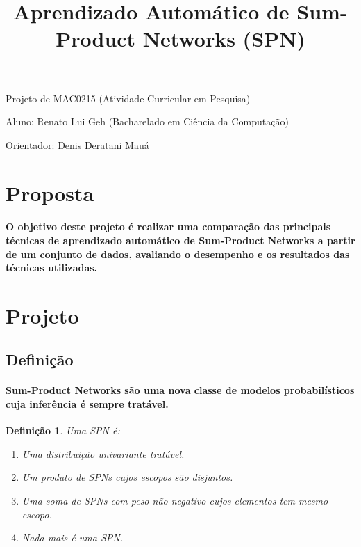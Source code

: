 \documentclass[a4paper,10pt]{article}
\title{\textbf{Aprendizado Automático de Sum-Product Networks (SPN)}}
\theoremstyle{plain}
\newtheorem*{spn-def}{Definição}
\begin{document}
\date{}
\author{}
\vspace*{-40pt}
{\let\newpage\relax\maketitle}

Projeto de MAC0215 (Atividade Curricular em Pesquisa)

Aluno: Renato Lui Geh (Bacharelado em Ciência da Computação)

Orientador: Denis Deratani Mauá

\section{Proposta}

\paragraph{
  O objetivo deste projeto é realizar uma comparação das principais técnicas de aprendizado 
automático de Sum-Product Networks a partir de um conjunto de dados, avaliando o desempenho 
e os resultados das técnicas utilizadas.
}

\section{Projeto}
\subsection{Definição}

\paragraph{
  Sum-Product Networks são uma nova classe de modelos probabilísticos cuja inferência é sempre
tratável.
}

\begin{spn-def} Uma SPN é:

\begin{enumerate} \itemsep0pt
  \item Uma distribuição univariante tratável.
  \item Um produto de SPNs cujos escopos são disjuntos.
  \item Uma soma de SPNs com peso não negativo cujos elementos tem mesmo escopo.
  \item Nada mais é uma SPN.
\end{enumerate}
\end{spn-def}
\end{document}
